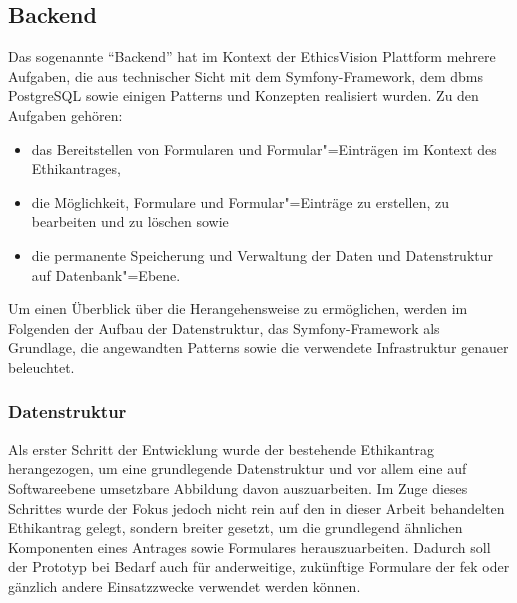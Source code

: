 \documentclass[a4paper,12pt,twoside]{scrreprt}
\begin{document}
\subsection{Backend}
\label{sub-sec:ausarbeitung-backend}

Das sogenannte \enquote{Backend} hat im Kontext der EthicsVision Plattform mehrere Aufgaben, die aus technischer Sicht mit dem Symfony-Framework, dem \ac{dbms} PostgreSQL sowie einigen Patterns und Konzepten realisiert wurden. Zu den Aufgaben gehören:
\begin{itemize}
    \item das Bereitstellen von Formularen und Formular"=Einträgen im Kontext des Ethikantrages,
    \item die Möglichkeit, Formulare und Formular"=Einträge zu erstellen, zu bearbeiten und zu löschen sowie
    \item die permanente Speicherung und Verwaltung der Daten und Datenstruktur auf Datenbank"=Ebene.
\end{itemize}

Um einen Überblick über die Herangehensweise zu ermöglichen, werden im Folgenden der Aufbau der Datenstruktur, das Symfony-Framework als Grundlage, die angewandten Patterns sowie die verwendete Infrastruktur genauer beleuchtet.

\subsubsection*{Datenstruktur}
\label{sub-sub-sec:backend-datenstruktur}

Als erster Schritt der Entwicklung wurde der bestehende Ethikantrag herangezogen, um eine grundlegende Datenstruktur und vor allem eine auf Softwareebene umsetzbare Abbildung davon auszuarbeiten. Im Zuge dieses Schrittes wurde der Fokus jedoch nicht rein auf den in dieser Arbeit behandelten Ethikantrag gelegt, sondern breiter gesetzt, um die grundlegend ähnlichen Komponenten eines Antrages sowie Formulares herauszuarbeiten. Dadurch soll der Prototyp bei Bedarf auch für anderweitige, zukünftige Formulare der \ac{fek} oder gänzlich andere Einsatzzwecke verwendet werden können.
\end{document}
